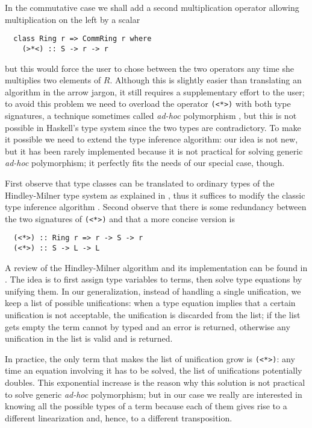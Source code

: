 In the commutative case we shall add a second multiplication operator
allowing multiplication on the left by a scalar
\begin{lstlisting}
  class Ring r => CommRing r where
    (>*<) :: S -> r -> r 
\end{lstlisting}
but this would force the user to chose between the two operators any
time she multiplies two elements of $R$. Although this is slightly
easier than translating an algorithm in the arrow jargon, it still
requires a supplementary effort to the user; to avoid this problem we
need to overload the operator \lstinline{(<*>)} with both type
signatures, a technique sometimes called \emph{ad-hoc} polymorphism
\cite{Str00}, but this is not possible in Haskell's type system since
the two types are contradictory.  To make it possible we need to
extend the type inference algorithm: our idea is not new, but it has
been rarely implemented because it is not practical for solving
generic \emph{ad-hoc} polymorphism; it perfectly fits the needs of our
special case, though.

First observe that type classes can be translated to ordinary types of
the Hindley-Milner type system as explained in \cite[$\S 4$]{WaBl89},
thus it suffices to modify the classic type inference algorithm
\cite{DM82,Cardelli}. Second observe that there is some redundancy
between the two signatures of \lstinline{(<*>)} and that a more
concise version is
\begin{lstlisting}
  (<*>) :: Ring r => r -> S -> r
  (<*>) :: S -> L -> L
\end{lstlisting}

A review of the Hindley-Milner algorithm and its implementation can be
found in \cite{Cardelli}. The idea is to first assign type variables
to terms, then solve type equations by unifying them.  In our
generalization, instead of handling a single unification, we keep a
list of possible unifications: when a type equation implies that a
certain unification is not acceptable, the unification is discarded
from the list; if the list gets empty the term cannot by typed and an
error is returned, otherwise any unification in the list is valid and
is returned.

In practice, the only term that makes the list of unification grow is
\lstinline{(<*>)}: any time an equation involving it has to be solved,
the list of unifications potentially doubles. This exponential
increase is the reason why this solution is not practical to solve
generic \emph{ad-hoc} polymorphism; but in our case we really are
interested in knowing all the possible types of a term because each of
them gives rise to a different linearization and, hence, to a
different transposition.

